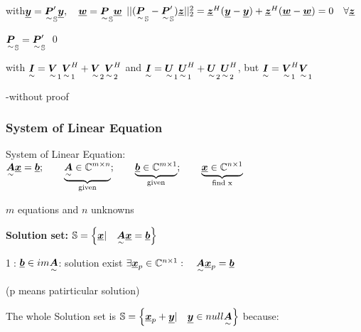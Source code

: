 \quad with\quad $\vec{y}=\ma{P}'_\mathbb{S}\vec{y},\quad \vec{w}=\ma{P}_\mathbb{S}\vec{w}$
\pfeil  $||(\ma{P}_\mathbb{S}-\ma{P}_\mathbb{S}')\vec{z} ||_2^2=\vec{z}^H(\vec{y}-\vec{y})+\vec{z}^H(\vec{w}-\vec{w})=0 \quad \forall \vec{z}$

\pfeil $\ma{P}_\mathbb{S}=\ma{P}_\mathbb{S}'$
\qed

with $\ma{I}=\ma{V}_1\ma{V}_1^H+\ma{V}_2\ma{V}_2^H$ and $\ma{I}=\ma{U}_1\ma{U}_1^H+\ma{U}_2\ma{U}_2^H$, but $\ma{I}=\ma{V}_1^H\ma{V}_1$
\begin{flushright}-without proof\end{flushright}


\subsubsection{System of Linear Equation}

System of Linear Equation: $\ma{A}\vec{x}=\vec{b}; \qquad \underbrace{\ma{A}\in\mathbb{C}^{m\times n}}_{\textrm{given}};\qquad \underbrace{\vec{b}\in\mathbb{C}^{m\times 1}}_{\textrm{given}};\qquad \underbrace{\vec{x}\in\mathbb{C}^{n\times 1}}_{\textrm{find x}}$

\pfeil $m$ equations and $n$ unknowns 

\textbf{Solution set: } $\mathbb{S}=\left\lbrace \vec{x}|\quad \ma{A}\vec{x}=\vec{b} \right\rbrace$

\textcircled{1}: \quad $\vec{b}\in im\ma{A}$: \quad solution exist \quad $\exists\vec{x}_p \in\mathbb{C}^{n\times 1}:\quad \ma{A}\vec{x}_p=\vec{b}$ \qquad \begin{footnotesize}(p means patirticular solution)\end{footnotesize}

The whole Solution set is 
$\mathbb{S}=\left\lbrace \vec{x}_p+\vec{y}|\quad \vec{y}\in null\ma{A} \right\rbrace$ 
\quad because:

